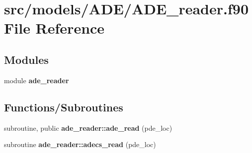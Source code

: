 \section{src/models/\+A\+D\+E/\+A\+D\+E\+\_\+reader.f90 File Reference}
\label{_a_d_e__reader_8f90}
\subsection*{Modules}
\begin{DoxyCompactItemize}
\item 
module {\bf ade\+\_\+reader}
\end{DoxyCompactItemize}
\subsection*{Functions/\+Subroutines}
\begin{DoxyCompactItemize}
\item 
subroutine, public {\bf ade\+\_\+reader\+::ade\+\_\+read} (pde\+\_\+loc)
\item 
subroutine {\bf ade\+\_\+reader\+::adecs\+\_\+read} (pde\+\_\+loc)
\end{DoxyCompactItemize}
